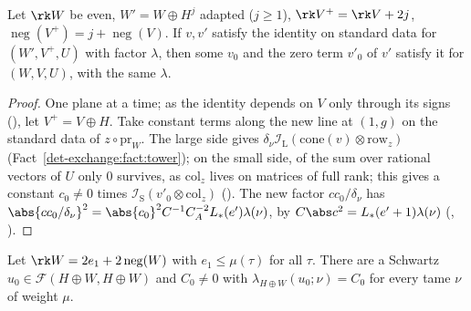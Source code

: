 \begin{proposition}
\label{det-exchange:prop:descent}
Let $\rk W$ be even, $W'=W\oplus H^j$ adapted ($j\ge1$), $\rk V^+=\rk V+2j$,
$\operatorname{neg}(V^+)=j+\operatorname{neg}(V)$. If $v,v'$ satisfy the identity on standard data
for $(W',V^+,U)$ with factor $\lambda$, then some $v_0$ and the zero term $v'_0$ of $v'$ satisfy it
for $(W,V,U)$, with the same $\lambda$.
\end{proposition}

\begin{proof}
One plane at a time; as the identity depends on $V$ only through its signs
(), let $V^+=V\oplus H$. Take constant
terms along the new line at $(1,g)$ on the standard data of $z\circ\mathrm{pr}_W$. The large side
gives $\delta_\nu\mathcal I_{\mathrm L}(\mathrm{cone}(v)\otimes\mathrm{row}_z)$
(Fact~\ref{det-exchange:fact:tower}); on the small side, of the sum over rational vectors of $U$
only $0$ survives, as $\mathrm{col}_z$ lives on matrices of full rank; this gives a constant
$c_0\ne0$ times $\mathcal I_{\mathrm S}(v'_0\otimes\mathrm{col}_z)$
(). The new factor
$cc_0/\delta_\nu$ has
$\abs{cc_0/\delta_\nu}^2=\abs{c_0}^2C^{-1}C_A^{-2}L_*(e')\lambda(\nu)$, by
$C\abs c^2=L_*(e'+1)\lambda(\nu)$ (,
).
\end{proof}

\begin{proposition}
\label{det-exchange:prop:equalrank}
Let $\rk W=2e_1+2\operatorname{neg}(W)$ with $e_1\le\mu(\tau)$ for all $\tau$. There are a Schwartz
$u_0\in\mathcal F(H\oplus W,H\oplus W)$ and $C_0\ne0$ with $\lambda_{H\oplus W}(u_0;\nu)=C_0$ for
every tame $\nu$ of weight $\mu$.
\end{proposition}

